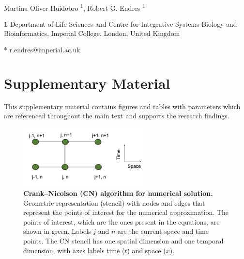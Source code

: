 \documentclass[10pt,letterpaper]{article}
\begin{document}
\vspace*{0.2in}

\begin{flushleft}
{\Large
\textbf{} %
}
\newline
\\
Martina Oliver Huidobro \textsuperscript{1},
Robert G. Endres \textsuperscript{1}


\bigskip
\textbf{1} Department of Life Sciences and Centre for Integrative Systems Biology and Bioinformatics, Imperial College, London, United Kingdom
\\
\bigskip

* r.endres@imperial.ac.uk

\end{flushleft}



\section*{Supplementary Material}

This supplementary material contains figures and tables with parameters which are referenced throughout the main text and supports the research findings.

\newcommand{\beginsupplement}{%
    \setcounter{table}{0}
    \renewcommand{\thetable}{S\arabic{table}}%
    \setcounter{figure}{0}
    \renewcommand{\thefigure}{S\arabic{figure}}%
}
\beginsupplement

\begin{figure}[!ht]
    \center
    \includegraphics[width=0.6\textwidth]{figures/stencils}

    \caption{{\bf Crank–Nicolson (CN) algorithm for numerical solution.}  Geometric representation (stencil) with nodes and edges that represent the points of interest for the numerical approximation. The points of interest, which are the ones present in the equations, are shown in green. Labels $j$ and $n$ are the current space and time points. The CN stencil has one spatial dimension and one temporal dimension, with axes labels time ($t$) and space ($x$). }   \label{sup_fig1}
\end{figure}
\end{document}
